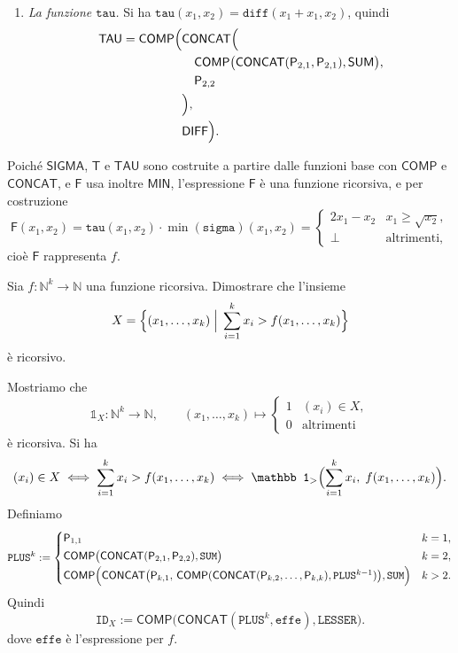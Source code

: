 \begin{sol}
\begin{enumerate}
    \item \emph{La funzione $\texttt{tau}$.} Si ha $\texttt{tau}(x_1,x_2)=\texttt{diff}(x_1+x_1,x_2)$, quindi
    \[
    \begin{aligned}
        \mathsf{TAU}=\mathsf{COMP}\Bigl(
        &\mathsf{CONCAT}\Bigl(\\
        &\quad\mathsf{COMP}\bigl(\mathsf{CONCAT}(\mathsf P_{2,1},\mathsf P_{2,1}),\mathsf{SUM}\bigr),\\
        &\quad\mathsf P_{2,2}\\
        &\Bigr),\\
        &\mathsf{DIFF}\Bigr).
    \end{aligned}
    \]
\end{enumerate}

Poiché $\mathsf{SIGMA}$, $\mathsf{T}$ e $\mathsf{TAU}$ sono costruite a partire dalle funzioni base con $\mathsf{COMP}$ e $\mathsf{CONCAT}$, e $\mathsf F$ usa inoltre $\mathsf{MIN}$, l'espressione $\mathsf F$ è una funzione ricorsiva, e per costruzione
\[
    \mathsf F(x_1,x_2)=\texttt{tau}(x_1,x_2)\cdot\min(\texttt{sigma})(x_1,x_2)=
    \begin{cases}
        2x_1-x_2 & x_1\geq\sqrt{x_2},\\
        \bot & \text{altrimenti,}
    \end{cases}
\]
cioè $\mathsf F$ rappresenta $f$.
\end{sol}

\newpage

\begin{ex}
Sia $f\colon\mathbb N^k\to\mathbb N$ una funzione ricorsiva. Dimostrare che l'insieme
\[
    X=\Bigl\{(x_1,\dots,x_k)\;\Big|\;\sum_{i=1}^{k}x_i>f(x_1,\dots,x_k)\Bigr\}
\]
è ricorsivo.
\end{ex}

\begin{sol}
Mostriamo che
\[
    \mathbb 1_X\colon\mathbb N^k\to\mathbb N,\qquad (x_1,\dots,x_k)\longmapsto
    \begin{cases}
        1 & (x_i)\in X,\\
        0 & \text{altrimenti}
    \end{cases}
\]
è ricorsiva. Si ha
\[
    (x_i)\in X\iff\sum_{i=1}^{k}x_i>f(x_1,\dots,x_k)\iff\mathbb 1_{>}\Bigl(\sum_{i=1}^{k}x_i,\;f(x_1,\dots,x_k)\Bigr).
\]
Definiamo
\[
    \texttt{PLUS}^k:=
    \begin{cases}
        \mathsf P_{1,1} & k=1,\\[2pt]
        \mathsf{COMP}\bigl(\mathsf{CONCAT}(\mathsf P_{2,1},\mathsf P_{2,2}),\texttt{SUM}\bigr) & k=2,\\[2pt]
        \mathsf{COMP}\Bigl(\mathsf{CONCAT}\bigl(\mathsf P_{k,1},\,\mathsf{COMP}(\mathsf{CONCAT}(\mathsf P_{k,2},\dots,\mathsf P_{k,k}),\texttt{PLUS}^{k-1})\bigr),\texttt{SUM}\Bigr) & k>2.
    \end{cases}
\]
Quindi
\[
    \texttt{ID}_X:=\mathsf{COMP}\bigl(\mathsf{CONCAT}(\texttt{PLUS}^k,\texttt{effe}),\texttt{LESSER}\bigr).
\]
dove $\texttt{effe}$ è l'espressione per $f$.
\end{sol}

